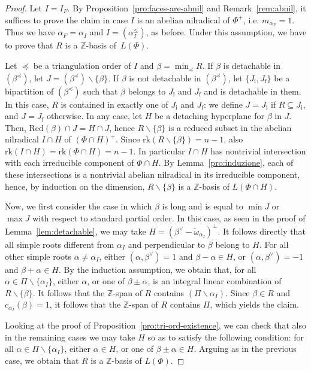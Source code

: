 \documentclass[ALCO,published]{cedram}
\theoremstyle{plain}
\newcommand\smeno{\smallsetminus}
\newcommand\ganz{\mathbb Z}
\newcommand\rk{\mathrm{rk}}
\newcommand\al{\alpha}
\newcommand\be{\beta}
\newcommand\red{\mathrm{Red}}
\newcommand\preq{\preccurlyeq}
\renewcommand{\leq}{\leqslant}
\begin{document}
\begin{proof}
Let $I=I_F$. 
By Proposition~\ref{pro:faces-are-abnil} and Remark~\ref{rem:abnil}, it suffices to prove the claim in case $I$ is an abelian nilradical of $\Phi^+$, i.e. $m_{\al_F}=1$. 
Thus we have  $\al_F=\al_I$ and $I=(\al_I^\leq)$, as before. 
Under this assumption, we have to prove that $R$ is a $\ganz$-basis of~$L(\Phi)$. 


\par
Let $\preq$ be a triangulation order of $I$ and $\be=\min_\preq R$. 
If $\be$ is detachable in  $(\be^\preq)$, let $J=(\be^\preq)\smeno\{\be\}$.
If $\be$ is not detachable in  $(\be^\preq)$, let $\{J_\mathrm i, J_\mathrm f\}$ be a bipartition of $(\be^\preq)$ such that $\be$ belongs to $J_\mathrm i$ and $J_\mathrm f$ and is detachable in  them.
In this case, $R$ is contained in exactly one of $J_\mathrm i$ and $J_\mathrm f$: we define $J=J_\mathrm i$ if $R\subseteq J_\mathrm i$, and $J=J_\mathrm f$ otherwise. 
In any case, let $H$ be a detaching hyperplane for $\be$ in $J$.
Then, $\red(\be)\cap J=H\cap J$, hence $R\smeno\{\be\}$ is a reduced subset in the abelian nilradical $I\cap H$ of $(\Phi\cap H)^+$. 
Since $\rk(R\smeno\{\be\})=n-1$, also $\rk(I\cap H)=\rk(\Phi\cap H)=n-1$.
In particular $I\cap H$ has nontrivial intersection with each irreducible component of  $\Phi\cap H$. 
By Lemma~\ref{pro:induzione}, each of these intersections  is a nontrivial  abelian nilradical in its irreducible component, hence, by induction on the dimension, $R\smeno\{\be\}$ is a $\ganz$-basis of $L(\Phi\cap H)$.

\par
Now, we first consider the case in which $\be$ is long and is equal to $\min J$ or $\max J$ with respect to standard partial order.
In this case, as seen in the proof of Lemma~\ref{lem:detachable}, we may take $H=(\be^\vee-\check\omega_{\al_I})^\perp$.
It follows directly that all simple roots different from $\al_I$ and perpendicular to $\be$ belong to $H$. 
For all other simple roots $\al\neq\al_I$, either $(\al, \be^\vee)=1$ and $\be-\al\in H$, or $(\al, \be^\vee)=-1$ and $\be+\al\in H$. 
By the induction assumption, we obtain that, for all $\al\in \Pi\smeno\{\al_I\}$, either $\al$, or one of $\be\pm \al$, is an integral linear combination of $R\smeno\{\be\}$. 
It follows that  the $\ganz$-span of $R$ contains $(\Pi\smeno\al_I)$. 
Since $\be\in R$ and $c_{\al_I}(\be)=1$, it follows that the $\ganz$-span of $R$ contains $\Pi$, which yields the claim.

\par
Looking at the proof of Proposition~\ref{pro:tri-ord-existence}, we can check that also in the remaining cases we may take $H$ so as to satisfy the following condition: for all $\al\in \Pi\smeno \{\al_I\}$, either $\al\in H$, or one of $\be\pm \al\in H$.
Arguing as in the previous case, we obtain that $R$ is a $\ganz$-basis of $L(\Phi)$.
\end{proof}
\end{document}
